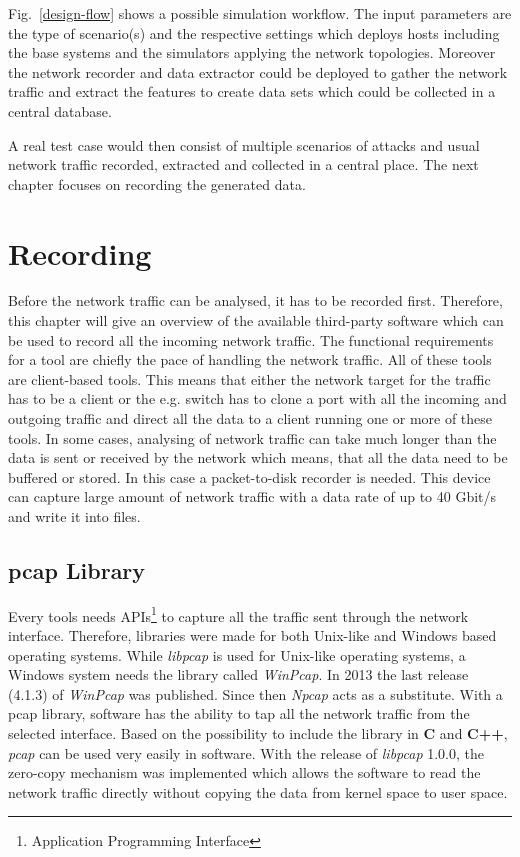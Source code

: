 \documentclass[conference]{IEEEtran}
\begin{document}
Fig.~\ref{design-flow} shows a possible simulation workflow. The input parameters are the type of scenario(s) and the respective settings which deploys hosts including the base systems and the simulators applying the network topologies. Moreover the network recorder and data extractor could be deployed to gather the network traffic and extract the features to create data sets which could be collected in a central database.

A real test case would then consist of multiple scenarios of attacks and usual network traffic recorded, extracted and collected in a central place. The next chapter focuses on recording the generated data.

\section{Recording}

Before the network traffic can be analysed, it has to be recorded first. Therefore, this chapter will give an overview of the available third-party software which can be used to record all the incoming network traffic. The functional requirements for a tool are chiefly the pace of handling the network traffic. All of these tools are client-based tools. This means that either the network target for the traffic has to be a client or the e.g. switch has to clone a port with all the incoming and outgoing traffic and direct all the data to a client running one or more of these tools. In some cases, analysing of network traffic can take much longer than the data is sent or received by the network which means, that all the data need to be buffered or stored. In this case a packet-to-disk recorder is needed. This device can capture large amount of network traffic with a data rate of up to 40 Gbit/s and write it into files. 

\subsection{pcap Library}

Every tools needs APIs\footnote{Application Programming Interface} to capture all the traffic sent through the network interface. Therefore, libraries were made for both Unix-like and Windows based operating systems. While \textit{libpcap} is used for Unix-like operating systems, a Windows system needs the library called \textit{WinPcap}. In 2013 the last release (4.1.3) of \textit{WinPcap} was published. Since then \textit{Npcap} acts as a substitute\cite{winpcaporg}. With a pcap library, software has the ability to tap all the network traffic from the selected interface. Based on the possibility to include the library in \textbf{C} and \textbf{C++}, \textit{pcap} can be used very easily in software. With the release of \textit{libpcap} 1.0.0, the zero-copy mechanism was implemented which allows the software to read the network traffic directly without copying the data from kernel space to user space.
\end{document}
